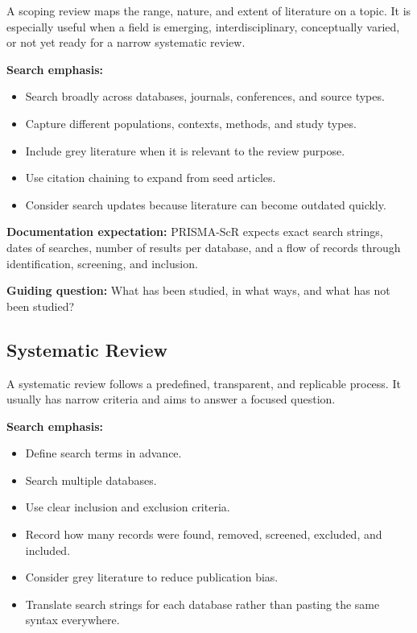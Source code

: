 \documentclass[11pt,letterpaper]{article}
\begin{document}
A scoping review maps the range, nature, and extent of literature on a topic. It is especially useful when a field is emerging, interdisciplinary, conceptually varied, or not yet ready for a narrow systematic review.

\textbf{Search emphasis:}

\begin{itemize}
  \item Search broadly across databases, journals, conferences, and source types.
  \item Capture different populations, contexts, methods, and study types.
  \item Include grey literature when it is relevant to the review purpose.
  \item Use citation chaining to expand from seed articles.
  \item Consider search updates because literature can become outdated quickly.
\end{itemize}

\textbf{Documentation expectation:} PRISMA-ScR expects exact search strings, dates of searches, number of results per database, and a flow of records through identification, screening, and inclusion.

\textbf{Guiding question:} What has been studied, in what ways, and what has not been studied?

\subsection{Systematic Review}

A systematic review follows a predefined, transparent, and replicable process. It usually has narrow criteria and aims to answer a focused question.

\textbf{Search emphasis:}

\begin{itemize}
  \item Define search terms in advance.
  \item Search multiple databases.
  \item Use clear inclusion and exclusion criteria.
  \item Record how many records were found, removed, screened, excluded, and included.
  \item Consider grey literature to reduce publication bias.
  \item Translate search strings for each database rather than pasting the same syntax everywhere.
\end{itemize}
\end{document}
